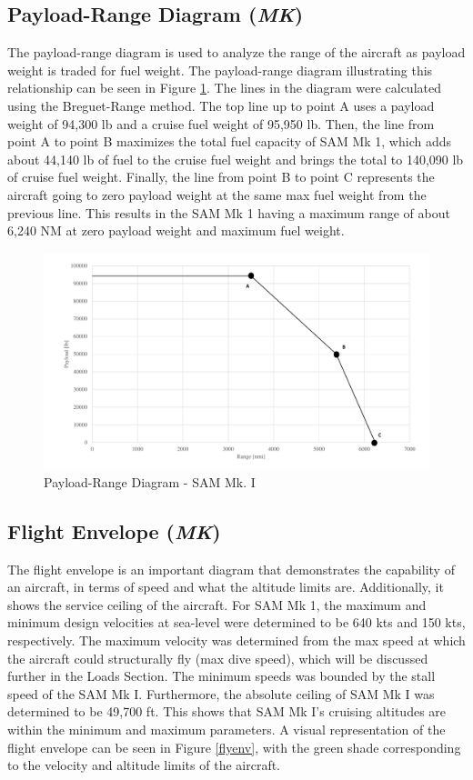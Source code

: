 \subsection{Payload-Range Diagram (\textit{MK})}
The payload-range diagram is used to analyze the range of the aircraft as payload weight is traded for fuel weight. The payload-range diagram illustrating this relationship can be seen in Figure \ref{payrang}. The lines in the diagram were calculated using the Breguet-Range method. The top line up to point A uses a payload weight of 94,300 lb and a cruise fuel weight of 95,950 lb. Then, the line from point A to point B maximizes the total fuel capacity of SAM Mk 1, which adds about 44,140 lb of fuel to the cruise fuel weight and brings the total to 140,090 lb of cruise fuel weight. Finally, the line from point B to point C represents the aircraft going to zero payload weight at the same max fuel weight from the previous line. This results in the SAM Mk 1 having a maximum range of about 6,240 NM at zero payload weight and maximum fuel weight.

\begin{figure}[H]
    \centering
    \includegraphics[width=1.0\textwidth]{Photos/Payload_Range.pdf}
    \caption{Payload-Range Diagram -  SAM Mk. I}
    \label{payrang}
 \end{figure}

\subsection{Flight Envelope (\textit{MK})}
\label{ssfl}
The flight envelope is an important diagram that demonstrates the capability of an aircraft, in terms of speed and what the altitude limits are. Additionally, it shows the service ceiling of the aircraft. For SAM Mk 1, the maximum and minimum design velocities at sea-level were determined to be 640 kts and 150 kts, respectively. The maximum velocity was determined from the max speed at which the aircraft could structurally fly (max dive speed), which will be discussed further in the Loads Section. The minimum speeds was bounded by the stall speed of the SAM Mk I. Furthermore, the absolute ceiling of SAM Mk I was determined to be 49,700 ft. This shows that SAM Mk I's cruising altitudes are within the minimum and maximum parameters. A visual representation of the flight envelope can be seen in Figure \ref{flyenv}, with the green shade corresponding to the velocity and altitude limits of the aircraft. 

